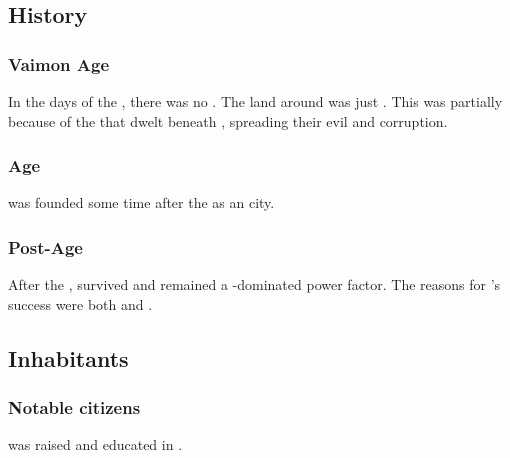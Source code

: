 \subsection{History}





\subsubsection{Vaimon Age}
In the days of the \VaimonCaliphate, there was no \Yormis. 
The land around  was just \wylde. 
This was partially because of the \xss that dwelt beneath \Shrun, spreading their evil and corruption. 





\subsubsection{\Ortaican Age}
\Yormis was founded some time after the  as an \Ortaican city. 





\subsubsection{Post-\Ortaican Age}
After the , \Yormis survived and remained a \rethyax-dominated power factor. 
The reasons for \Yormis's success were both  and . 










\subsection{Inhabitants}





\subsubsection{Notable citizens}
 was raised and educated in \Yormis. 









